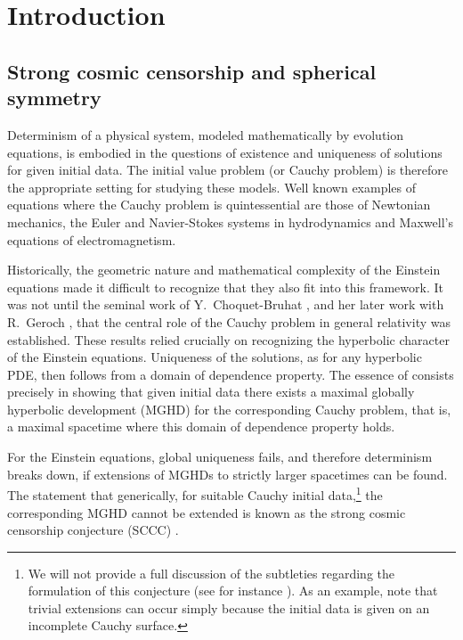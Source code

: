 \documentclass[a4paper,11pt,oneside,reqno]{amsart}
\begin{document}
\setcounter{tocdepth}{1}
\tableofcontents



\vspace{5mm}

\section{Introduction}

\subsection{Strong cosmic censorship and spherical symmetry}
Determinism of a physical system, modeled mathematically by evolution equations, is embodied in the questions of existence and uniqueness of solutions for given initial data. The initial value problem (or Cauchy problem) is therefore the appropriate setting for studying these models. Well known examples of equations where the Cauchy problem is quintessential are those of Newtonian mechanics, the Euler and Navier-Stokes systems in hydrodynamics and Maxwell's equations of electromagnetism.

Historically, the geometric nature and mathematical complexity of the Einstein equations made it difficult to recognize that they also fit into this framework. It was not until the seminal work of Y.~Choquet-Bruhat \cite{Choquet52}, and her later work with R.~Geroch \cite{Choquet69}, that the central role of the Cauchy problem in general relativity was established. These results relied crucially on recognizing the hyperbolic character of the Einstein equations. Uniqueness of the solutions, as for any hyperbolic PDE, then follows from a domain of dependence property. The essence of \cite{Choquet69} consists precisely in showing that given initial data there exists a maximal globally hyperbolic development (MGHD) for the corresponding Cauchy problem, that is, a maximal spacetime where this domain of dependence property holds.

For the Einstein equations, global uniqueness fails, and therefore determinism breaks down, if extensions of MGHDs to strictly larger spacetimes can be found. The statement that generically, for suitable  Cauchy initial data,\footnote{We will not provide a full discussion of the subtleties regarding the formulation of this conjecture (see for instance \cite{ChruscielSCC, RingstromCauchy}). As an example, note that trivial extensions can occur simply because the initial data is given on an incomplete Cauchy surface.} the corresponding MGHD cannot be extended is known as the strong cosmic censorship conjecture (SCCC) \cite{PenroseSingularities, ChruscielSCC, ChristodoulouGlobalnew}.
\end{document}
